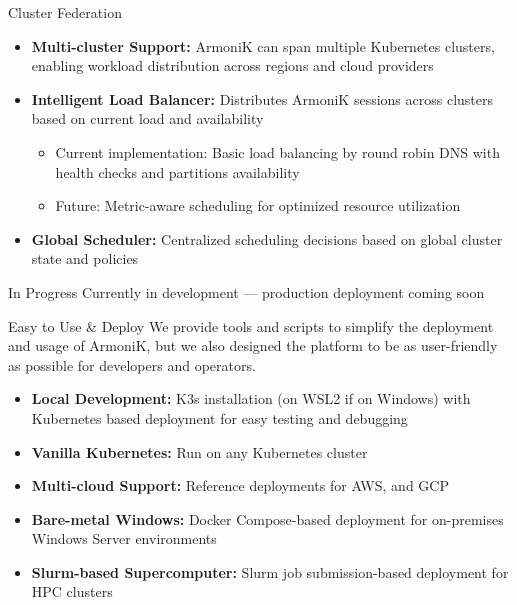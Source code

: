 \begin{frame}{Cluster Federation}
	\begin{itemize}
		\item \textbf{Multi-cluster Support:} ArmoniK can span multiple Kubernetes clusters, enabling workload distribution across regions and cloud providers
		\item \textbf{Intelligent Load Balancer:} Distributes ArmoniK sessions across clusters based on current load and availability
		      \begin{itemize}
			      \item Current implementation: Basic load balancing by round robin DNS with health checks and partitions availability
			      \item Future: Metric-aware scheduling for optimized resource utilization
		      \end{itemize}
		\item \textbf{Global Scheduler:} Centralized scheduling decisions based on global cluster state and policies
	\end{itemize}
	\vspace{0.5cm}
	\begin{block}{In Progress}
		Currently in development — production deployment coming soon
	\end{block}
\end{frame}

\begin{frame}{Easy to Use \& Deploy}
	We provide tools and scripts to simplify the deployment and usage of ArmoniK, but we also designed the platform to be as user-friendly as possible for developers and operators.
	\begin{itemize}
		\item \textbf{Local Development:} K3s installation (on WSL2 if on Windows) with Kubernetes based deployment for easy testing and debugging
		\item \textbf{Vanilla Kubernetes:} Run on any Kubernetes cluster
		\item \textbf{Multi-cloud Support:} Reference deployments for AWS, and GCP
		\item \textbf{Bare-metal Windows:} Docker Compose-based deployment for on-premises Windows Server environments
		\item \textbf{Slurm-based Supercomputer:} Slurm job submission-based deployment for HPC clusters
	\end{itemize}
\end{frame}

